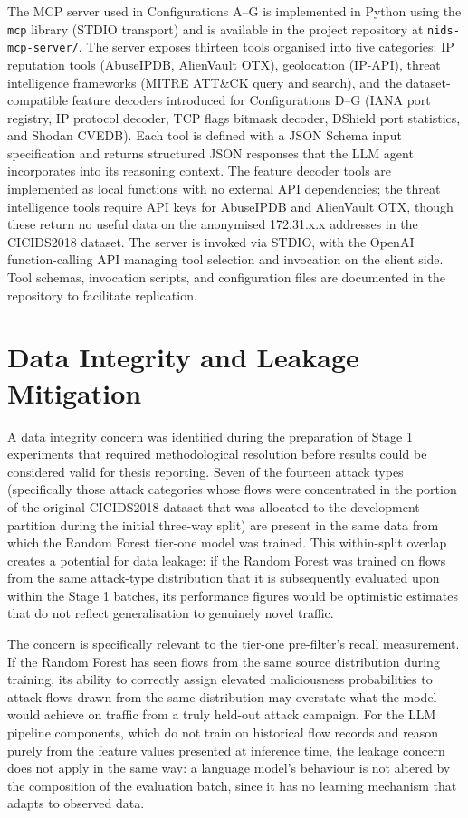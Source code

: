 \documentclass[../main.tex]{subfiles}
\begin{document}
The MCP server used in Configurations A--G is implemented in Python using the \texttt{mcp} library (STDIO transport) and is available in the project repository at \texttt{nids-mcp-server/}. The server exposes thirteen tools organised into five categories: IP reputation tools (AbuseIPDB, AlienVault OTX), geolocation (IP-API), threat intelligence frameworks (MITRE ATT\&CK query and search), and the dataset-compatible feature decoders introduced for Configurations D--G (IANA port registry, IP protocol decoder, TCP flags bitmask decoder, DShield port statistics, and Shodan CVEDB). Each tool is defined with a JSON Schema input specification and returns structured JSON responses that the LLM agent incorporates into its reasoning context. The feature decoder tools are implemented as local functions with no external API dependencies; the threat intelligence tools require API keys for AbuseIPDB and AlienVault OTX, though these return no useful data on the anonymised 172.31.x.x addresses in the CICIDS2018 dataset. The server is invoked via STDIO, with the OpenAI function-calling API managing tool selection and invocation on the client side. Tool schemas, invocation scripts, and configuration files are documented in the repository to facilitate replication.

\section{Data Integrity and Leakage Mitigation}
\label{sec:data-integrity}

A data integrity concern was identified during the preparation of Stage 1 experiments that required methodological resolution before results could be considered valid for thesis reporting. Seven of the fourteen attack types (specifically those attack categories whose flows were concentrated in the portion of the original CICIDS2018 dataset that was allocated to the development partition during the initial three-way split) are present in the same data from which the Random Forest tier-one model was trained. This within-split overlap creates a potential for data leakage: if the Random Forest was trained on flows from the same attack-type distribution that it is subsequently evaluated upon within the Stage 1 batches, its performance figures would be optimistic estimates that do not reflect generalisation to genuinely novel traffic.

The concern is specifically relevant to the tier-one pre-filter's recall measurement. If the Random Forest has seen flows from the same source distribution during training, its ability to correctly assign elevated maliciousness probabilities to attack flows drawn from the same distribution may overstate what the model would achieve on traffic from a truly held-out attack campaign. For the LLM pipeline components, which do not train on historical flow records and reason purely from the feature values presented at inference time, the leakage concern does not apply in the same way: a language model's behaviour is not altered by the composition of the evaluation batch, since it has no learning mechanism that adapts to observed data.
\end{document}
